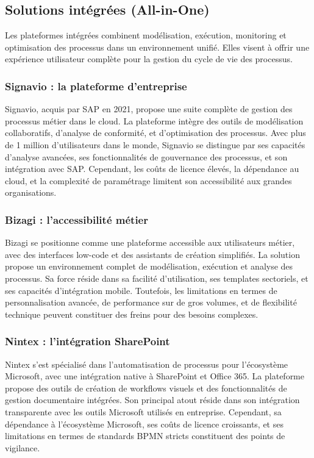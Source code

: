 \subsection{Solutions intégrées (All-in-One)}

Les plateformes intégrées combinent modélisation, exécution, monitoring et optimisation des processus dans un environnement unifié. Elles visent à offrir une expérience utilisateur complète pour la gestion du cycle de vie des processus.

\subsubsection{Signavio : la plateforme d'entreprise}
Signavio, acquis par SAP en 2021, propose une suite complète de gestion des processus métier dans le cloud. La plateforme intègre des outils de modélisation collaboratifs, d'analyse de conformité, et d'optimisation des processus. Avec plus de 1 million d'utilisateurs dans le monde, Signavio se distingue par ses capacités d'analyse avancées, ses fonctionnalités de gouvernance des processus, et son intégration avec SAP. Cependant, les coûts de licence élevés, la dépendance au cloud, et la complexité de paramétrage limitent son accessibilité aux grandes organisations.

\subsubsection{Bizagi : l'accessibilité métier}
Bizagi se positionne comme une plateforme accessible aux utilisateurs métier, avec des interfaces low-code et des assistants de création simplifiés. La solution propose un environnement complet de modélisation, exécution et analyse des processus. Sa force réside dans sa facilité d'utilisation, ses templates sectoriels, et ses capacités d'intégration mobile. Toutefois, les limitations en termes de personnalisation avancée, de performance sur de gros volumes, et de flexibilité technique peuvent constituer des freins pour des besoins complexes.

\subsubsection{Nintex : l'intégration SharePoint}
Nintex s'est spécialisé dans l'automatisation de processus pour l'écosystème Microsoft, avec une intégration native à SharePoint et Office 365. La plateforme propose des outils de création de workflows visuels et des fonctionnalités de gestion documentaire intégrées. Son principal atout réside dans son intégration transparente avec les outils Microsoft utilisés en entreprise. Cependant, sa dépendance à l'écosystème Microsoft, ses coûts de licence croissants, et ses limitations en termes de standards BPMN stricts constituent des points de vigilance.

